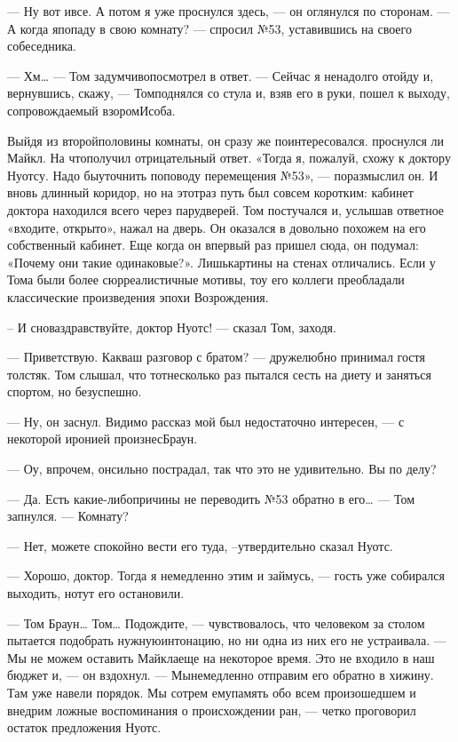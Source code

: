 — Ну вот ивсе. А потом я уже проснулся здесь, — он оглянулся по сторонам. — А когда япопаду в свою комнату? — спросил №53, уставившись на своего собеседника.

— Хм… — Том задумчивопосмотрел в ответ. — Сейчас я ненадолго отойду и, вернувшись, скажу, — Томподнялся со стула и, взяв его в руки, пошел к выходу, сопровождаемый взоромИсоба.

Выйдя из второйполовины комнаты, он сразу же поинтересовался. проснулся ли Майкл. На чтополучил отрицательный ответ. «Тогда я, пожалуй, схожу к доктору Нуотсу. Надо быуточнить поповоду перемещения №53», — поразмыслил он. И вновь длинный коридор, но на этотраз путь был совсем коротким: кабинет доктора находился всего через парудверей. Том постучался и, услышав ответное «входите, открыто», нажал на дверь. Он оказался в довольно похожем на его собственный кабинет. Еще когда он впервый раз пришел сюда, он подумал: «Почему они такие одинаковые?». Лишькартины на стенах отличались. Если у Тома были более сюрреалистичные мотивы, тоу его коллеги преобладали классические произведения эпохи Возрождения.

– И сноваздравствуйте, доктор Нуотс! — сказал Том, заходя.

— Приветствую. Какваш разговор с братом? — дружелюбно принимал гостя толстяк. Том слышал, что тотнесколько раз пытался сесть на диету и заняться спортом, но безуспешно.

— Ну, он заснул. Видимо рассказ мой был недостаточно интересен, — с некоторой иронией произнесБраун.

— Оу, впрочем, онсильно пострадал, так что это не удивительно. Вы по делу?

— Да. Есть какие-либопричины не переводить №53 обратно в его… — Том запнулся. — Комнату?

— Нет, можете спокойно вести его туда, –утвердительно сказал Нуотс.

— Хорошо, доктор. Тогда я немедленно этим и займусь, — гость уже собирался выходить, нотут его остановили.

— Том Браун… Том… Подождите, — чувствовалось, что человеком за столом пытается подобрать нужнуюинтонацию, но ни одна из них его не устраивала. — Мы не можем оставить Майклаеще на некоторое время. Это не входило в наш бюджет и, — он вздохнул. — Мынемедленно отправим его обратно в хижину. Там уже навели порядок. Мы сотрем емупамять обо всем произошедшем и внедрим ложные воспоминания о происхождении ран, — четко проговорил остаток предложения Нуотс.


